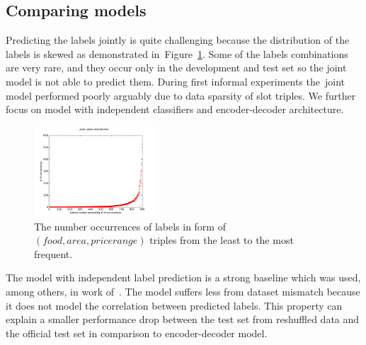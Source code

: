 \documentclass{itatnew}
\begin{document}
\subsection{Comparing models}
\label{sec:eval}

Predicting the labels jointly is quite challenging because the distribution of the labels is skewed as demonstrated in~Figure~\ref{fig:labels}.
Some of the labels combinations are very rare, and they occur only in the development and test set so the joint model is not able to predict them.
During first informal experiments the~joint model performed poorly arguably due to data sparsity of slot triples. We further focus on model with independent classifiers and encoder-decoder architecture.

\begin{figure}
\vspace{-0.80em}
    \begin{center}
\includegraphics[width=0.4\textwidth]{jointLabelsDistrib}
    \end{center}
\vspace{-1.80em}
\caption{The number occurrences of labels in form of $(food, area, pricerange)$ triples from the least to the most frequent.}
\label{fig:labels}
\end{figure}

The model with independent label prediction is a strong baseline which was used, among others, in work of~\citet{zilka2015incremental}.
The model suffers less from dataset mismatch because it does not model the correlation between predicted labels.
This property can explain a smaller performance drop between the test set from reshuffled data and the official test set in comparison to encoder-decoder model.
\end{document}

